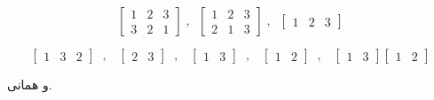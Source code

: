 	$$
	\begin{bmatrix}
	1 & 2 & 3 \\
	3 & 2 & 1
	\end{bmatrix} \; ,\; \;
	\begin{bmatrix}
	1 & 2 & 3 \\
	2 & 1 & 3
	\end{bmatrix} \; ,\; \;
	\begin{bmatrix}
	1 & 2 & 3
	\end{bmatrix}
	$$
	
	$$
	\begin{bmatrix}
	1 & 3 & 2
	\end{bmatrix} \; \; ,\;\;\;
	\begin{bmatrix}
	2 & 3
	\end{bmatrix} \; \; ,\;\;\;
	\begin{bmatrix}
	1 & 3
	\end{bmatrix} \; \; ,\;\;\;
	\begin{bmatrix}
	1 & 2
	\end{bmatrix} \; \; ,\;\;\;
	\begin{bmatrix}
	1 & 3
	\end{bmatrix}\begin{bmatrix}
	1 & 2
	\end{bmatrix}
	$$
	
	و همانی.
	
